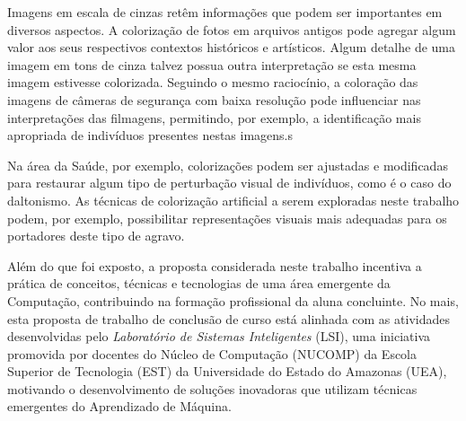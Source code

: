 Imagens em escala de cinzas retêm informações que podem ser importantes em diversos aspectos. A colorização de fotos em arquivos antigos pode agregar algum valor aos seus respectivos contextos históricos e artísticos. Algum detalhe de uma imagem em tons de cinza talvez possua outra interpretação se esta mesma imagem estivesse colorizada. Seguindo o mesmo raciocínio, a coloração das imagens de câmeras de segurança com baixa resolução pode influenciar nas interpretações das filmagens, permitindo, por exemplo, a identificação mais apropriada de indivíduos presentes nestas imagens.s

Na área da Saúde, por exemplo, colorizações podem ser ajustadas e modificadas para restaurar algum tipo de perturbação visual de indivíduos, como é o caso do daltonismo. As técnicas de colorização artificial a serem exploradas neste trabalho podem, por exemplo, possibilitar representações visuais mais adequadas para os portadores deste tipo de agravo.

Além do que foi exposto, a proposta considerada neste trabalho incentiva a prática de conceitos, técnicas e tecnologias de uma área emergente da Computação, contribuindo na formação profissional da aluna concluinte. No mais, esta proposta de trabalho de conclusão de curso está alinhada com as atividades desenvolvidas pelo \emph{Laboratório de Sistemas Inteligentes} (LSI), uma iniciativa promovida por docentes do Núcleo de Computação (NUCOMP) da Escola Superior de Tecnologia (EST) da Universidade do Estado do Amazonas (UEA), motivando o desenvolvimento de soluções inovadoras que utilizam técnicas emergentes do Aprendizado de Máquina.

